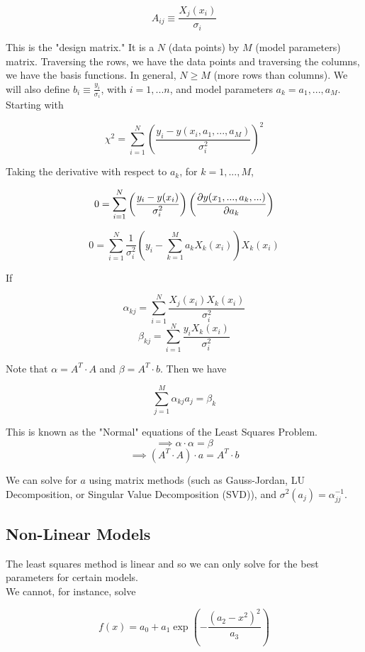 \documentclass[]{article}
\begin{document}
\[A_{ij} \equiv \frac{X_j(x_i)}{\sigma_i}\]

This is the "design matrix." It is a $N$ (data points) by $M$ (model parameters) matrix. Traversing the rows, we have the data points and traversing the columns, we have the basis functions. In general, $N\geq M$ (more rows than columns). We will also define $b_i \equiv \frac{y_i}{\sigma_i}$, with $i = 1, ... n$, and model parameters $a_k = a_1, ..., a_M$. \\

Starting with 

\[\chi^2 = \sum_{i=1}^N \left(\frac{y_i - y(x_i, a_1, ..., a_M)}{\sigma_i^2}\right)^2\]

Taking the derivative with respect to $a_k$, for $k = 1, ... , M$,

\[0 = \sum_{i=1}^N \left( \frac{y_i - y(x_i)}{\sigma_i^2}\right)\left( \pdv{y(x_1, ..., a_k, ...)}{a_k}\right) \]

\[0 = \sum_{i=1}^N \frac{1}{\sigma_i^2}\left( y_i - \sum_{k=1}^M a_k X_k(x_i)\right)X_k(x_i) \]

If 

\[\alpha_{kj} = \sum_{i=1}^N \frac{X_j(x_i)X_k(x_i)}{\sigma_i^2}\]
\[\beta_{kj} = \sum_{i=1}^N \frac{y_iX_k(x_i)}{\sigma_i^2}\]

Note that $\alpha = A^T\cdot A$ and  $\beta = A^T\cdot b$. Then we have 

\[\sum_{j=1}^M \alpha_{kj}a_j = \beta_k \]

This is known as the "Normal" equations of the Least Squares Problem.\\

\[\implies \alpha \cdot \alpha = \beta\]
\[\implies (A^T\cdot A)\cdot a = A^T \cdot b\]

We can solve for $a$ using matrix methods (such as Gauss-Jordan, LU Decomposition, or Singular Value Decomposition (SVD)), and $\sigma^2(a_j) = \alpha_{jj}^{-1}$.\\


\subsection{Non-Linear Models}\bigbreak

The least squares method is linear and so we can only solve for the best parameters for certain models.\\

We cannot, for instance, solve

\[f(x) = a_0 + a_1 \exp(-\frac{(a_2 - x^2)^2}{a_3})\]
\end{document}
